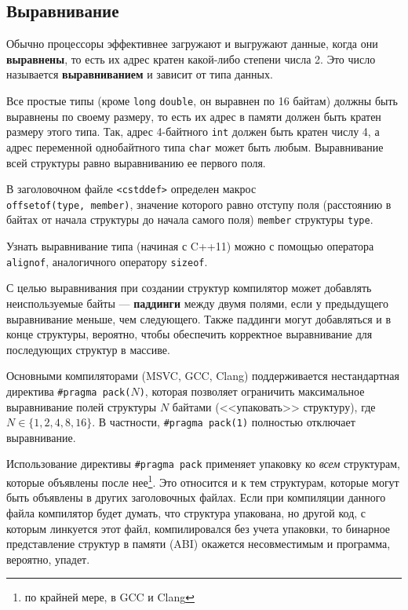 \subsection{Выравнивание}

Обычно процессоры эффективнее загружают и выгружают данные, когда они \textbf{выравнены},
то есть их адрес кратен какой-либо степени числа 2. Это число называется \textbf{выравниванием}
и зависит от типа данных.

Все простые типы (кроме \verb|long| \verb|double|,
он выравнен по 16 байтам) должны быть выравнены по своему размеру,
то есть их адрес в памяти должен быть кратен размеру этого типа.
Так, адрес 4-байтного \verb|int| должен быть кратен числу 4, а адрес переменной
однобайтного типа \verb|char| может быть любым.
Выравнивание всей структуры равно выравниванию ее первого поля.

В заголовочном файле \verb|<cstddef>| определен макрос\\ \verb|offsetof(type, member)|,
значение которого равно отступу поля (расстоянию в байтах от начала структуры до начала
самого поля) \verb|member| структуры \verb|type|.

Узнать выравнивание типа (начиная с C++11) можно с помощью
оператора \verb|alignof|, аналогичного оператору \verb|sizeof|.

С целью выравнивания при создании структур компилятор может добавлять
неиспользуемые байты --- \textbf{паддинги} между двумя полями,
если у предыдущего выравнивание меньше, чем следующего. Также паддинги
могут добавляться и в конце структуры, вероятно, чтобы обеспечить корректное
выравнивание для последующих структур в массиве.

Основными компиляторами (MSVC, GCC, Clang) поддерживается нестандартная директива
\verb|#pragma pack(|$N$\verb|)|, которая позволяет ограничить максимальное
выравнивание полей структуры $N$ байтами (<<упаковать>> структуру), где $N \in \{1,2,4,8,16\}$.
В частности, \verb|#pragma pack(1)| полностью отключает выравнивание.

Использование директивы \verb|#pragma pack|
применяет упаковку ко \textit{всем} структурам, которые объявлены после нее\footnote{по крайней мере, в GCC и Clang}.
Это относится и к тем структурам, которые могут быть объявлены в других заголовочных файлах.
Если при компиляции данного файла компилятор будет думать, что структура упакована,
но другой код, с которым линкуется этот файл, компилировался без учета упаковки,
то бинарное представление структур в памяти (ABI) окажется несовместимым и
программа, вероятно, упадет.

